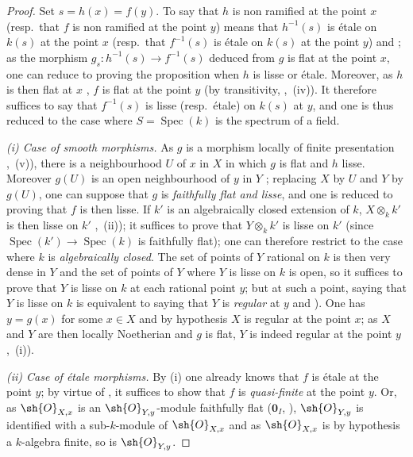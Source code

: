 \begin{proof}
Set $s=h(x)=f(y)$.
To say that $h$ is non ramified at the point $x$ (resp.\ that $f$ is non ramified at the point $y$) means that $h^{-1}(s)$ is \'etale on $k(s)$ at the point $x$ (resp.\ that $f^{-1}(s)$ is \'etale on $k(s)$ at the point $y$)  and ; as the morphism $g_s:h^{-1}(s)\to f^{-1}(s)$ deduced from $g$ is flat at the point $x$, one can reduce to proving the proposition when $h$ is lisse or \'etale.
Moreover, as $h$ is then flat at $x$ , $f$ is flat at the point $y$ (by transitivity, ,~(iv)).
It therefore suffices to say that $f^{-1}(s)$ is lisse (resp.\ \'etale) on $k(s)$ at $y$, and one is thus reduced to the case where $S=\operatorname{Spec}(k)$ is the spectrum of a field.

\emph{(i) Case of smooth morphisms.}
As $g$ is a morphism locally of finite presentation ,~(v)), there is a neighbourhood $U$ of $x$ in $X$ in which $g$ is flat  and $h$ lisse.
Moreover $g(U)$ is an open neighbourhood of $y$ in $Y$ ; replacing $X$ by $U$ and $Y$ by $g(U)$, one can suppose that $g$ is \emph{faithfully flat and lisse}, and one is reduced to proving that $f$ is then lisse.
If $k'$ is an algebraically closed extension of $k$, $X\otimes_k k'$ is then lisse on $k'$ ,~(ii)); it suffices to prove that $Y\otimes_k k'$ is lisse on $k'$ (since $\operatorname{Spec}(k')\to\operatorname{Spec}(k)$ is faithfully flat); one can therefore restrict to the case where $k$ is \emph{algebraically closed}.
The set of points of $Y$ rational on $k$ is then very dense in $Y$  and the set of points of $Y$ where $Y$ is lisse on $k$ is open, so it suffices to prove that $Y$ is lisse on $k$ at each rational point $y$; but at such a point, saying that $Y$ is lisse on $k$ is equivalent to saying that $Y$ is \emph{regular} at $y$  and ).
One has $y=g(x)$ for some $x\in X$ and by hypothesis  $X$ is regular at the point $x$; as $X$ and $Y$ are then locally Noetherian and $g$ is flat, $Y$ is indeed regular at the point $y$ ,~(i)).


\emph{(ii) Case of \'etale morphisms.}
By (i) one already knows that $f$ is \'etale at the point $y$; by virtue of , it suffices to show that $f$ is \emph{quasi-finite} at the point $y$.
Or, as $\sh{O}_{X,x}$ is an $\sh{O}_{Y,y}$-module faithfully flat ($\mathbf{0}_I$, ), $\sh{O}_{Y,y}$ is identified with a sub-$k$-module of $\sh{O}_{X,x}$ and as $\sh{O}_{X,x}$ is by hypothesis a $k$-algebra finite, so is $\sh{O}_{Y,y}$.
\end{proof}

